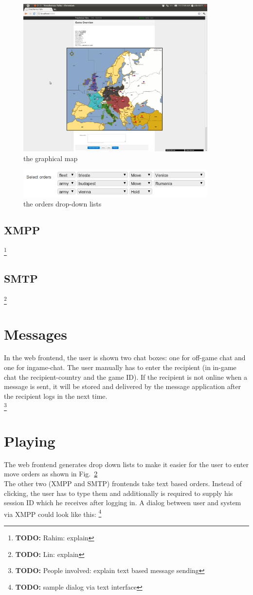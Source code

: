 \documentclass[11pt,a4paper]{report}
\newcommand{\todo}[1]{\footnote{{\color{red} {\bf TODO:} #1}}}
\begin{document}
\begin{figure}[h]
 \centering
 \includegraphics[width=10cm]{./graphics/graphicalmap.png}
 \caption{the graphical map}
 \label{fig:map}
\end{figure}

\begin{figure}[h]
 \centering
 \includegraphics[width=10cm]{./graphics/orderssmall.png}
 \caption{the orders drop-down lists}
 \label{fig:orders}
\end{figure}

\subsection{XMPP}
\todo{Rahim: explain}
\subsection{SMTP}
\todo{Lin: explain}
\section{Messages}
In the web frontend, the user is shown two chat boxes: one for off-game chat
and one for ingame-chat. The user manually has to enter the recipient (in
in-game chat the recipient-country and the game ID). If the recipient is not
online when a message is sent, it will be stored and delivered by the message
application after the recipient logs in the next time. \\
\todo{People involved: explain text based message sending}

\section{Playing}
The web frontend generates drop down lists to make it easier for the user to
enter move orders as shown in Fig.~\ref{fig:orders} \\
The other two (XMPP and SMTP) frontends take text based orders. Instead of
clicking, the user has to type them and additionally is required to supply
his session ID which he receives after logging in. A dialog between user and
system via XMPP could look like this: \todo{sample dialog via text interface}
\end{document}
